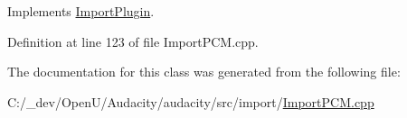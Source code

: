 Implements \hyperlink{class_import_plugin_abe16a65c8e0575fc7dcb0a9531f8f0a7}{Import\+Plugin}.



Definition at line 123 of file Import\+P\+C\+M.\+cpp.



The documentation for this class was generated from the following file\+:\begin{DoxyCompactItemize}
\item 
C\+:/\+\_\+dev/\+Open\+U/\+Audacity/audacity/src/import/\hyperlink{_import_p_c_m_8cpp}{Import\+P\+C\+M.\+cpp}\end{DoxyCompactItemize}
